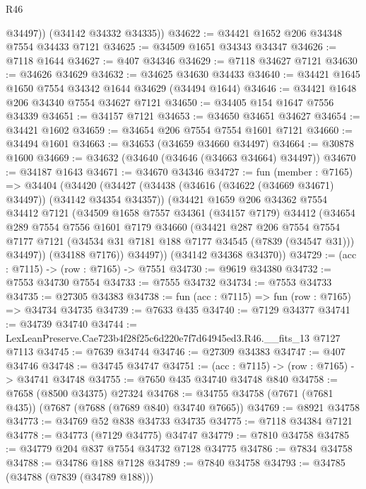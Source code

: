 \begin{lexlean}{R46}
\begin{coremodule}
          @34497))
      (@34142 @34332 @34335))
@34622 := @34421 @1652 @206 @34348 @7554 @34433 @7121
@34625 := @34509 @1651 @34343 @34347
@34626 := @7118 @1644
@34627 := @407 @34346
@34629 := @7118 @34627 @7121
@34630 := @34626 @34629
@34632 := @34625 @34630 @34433
@34640 := @34421 @1645 @1650 @7554 @34342 @1644 @34629 (@34494 @1644)
@34646 := @34421 @1648 @206 @34340 @7554 @34627 @7121
@34650 := @34405 @154 @1647 @7556 @34339
@34651 := @34157 @7121
@34653 := @34650 @34651 @34627
@34654 := @34421 @1602
@34659 := @34654 @206 @7554 @7554 @1601 @7121
@34660 := @34494 @1601
@34663 := @34653 (@34659 @34660 @34497)
@34664 := @30878 @1600
@34669 := @34632 (@34640 (@34646 (@34663 @34664) @34497))
@34670 := @34187 @1643
@34671 := @34670 @34346
@34727 := fun (member : @7165) =>
  @34404
    (@34420
      (@34427
        (@34438 (@34616 (@34622 (@34669 @34671) @34497)) (@34142 @34354 @34357))
        (@34421
          @1659
          @206
          @34362
          @7554
          @34412
          @7121
          (@34509
            @1658
            @7557
            @34361
            (@34157 @7179)
            @34412
            (@34654
              @289
              @7554
              @7556
              @1601
              @7179
              @34660
              (@34421
                @287
                @206
                @7554
                @7554
                @7177
                @7121
                (@34534 @31 @7181 @188 @7177 @34545 (@7839 (@34547 @31)))
                @34497))
            (@34188 @7176))
          @34497))
      (@34142 @34368 @34370))
@34729 := (acc : @7115) -> (row : @7165) -> @7551
@34730 := @9619 @34380
@34732 := @7553 @34730 @7554
@34733 := @7555 @34732
@34734 := @7553 @34733
@34735 := @27305 @34383
@34738 := fun (acc : @7115) => fun (row : @7165) => @34734 @34735
@34739 := @7633 @435
@34740 := @7129 @34377
@34741 := @34739 @34740
@34744 := LexLeanPreserve.Cae723b4f28f25c6d220e7f7d64945ed3.R46.__fits_13 @7127 @7113
@34745 := @7639 @34744
@34746 := @27309 @34383
@34747 := @407 @34746
@34748 := @34745 @34747
@34751 := (acc : @7115) -> (row : @7165) -> @34741 @34748
@34755 := @7650 @435 @34740 @34748 @840
@34758 := @7658 (@8500 @34375) @27324
@34768 := @34755 @34758 (@7671 (@7681 @435)) (@7687 (@7688 (@7689 @840) @34740 @7665))
@34769 := @8921 @34758
@34773 := @34769 @52 @838 @34733 @34735
@34775 := @7118 @34384 @7121
@34778 := @34773 (@7129 @34775) @34747
@34779 := @7810 @34758
@34785 := @34779 @204 @837 @7554 @34732 @7128 @34775
@34786 := @7834 @34758
@34788 := @34786 @188 @7128
@34789 := @7840 @34758
@34793 := @34785 (@34788 (@7839 (@34789 @188)))

\end{coremodule}
\end{lexlean}
